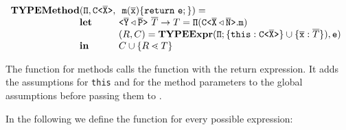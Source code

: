 \documentclass[a4paper,USenglish,cleveref, autoref, thm-restate]{lipics-v2021}
\begin{document}
\begin{gather*}
\begin{array}{@{}l@{}l@{}l}
  \typeMethod & (\ensuremath{\mv{\Pi} }, \exptype{C}{\ol{X}},\ &\  \mathtt{m}(\ol{x})\{ \mathtt{ return }\ \texttt{e}; \}) =\\
              & \textbf{let} & \exptype{}{\ol{Y} \triangleleft \ol{P}}\ \overline{T} \to T  = \mv{\Pi} (\exptype{C}{\ol{X} \triangleleft \ol{N}}.\mv{m})
  \\
              & %
                                                                                              & ({R}, \consSet) =
                                                                                                \typeExpr(\mv\Pi ; \set{\mv{this} :
                                                                                                \exptype{C}{\ol{X}} } \cup \set{ \ol{x} : \overline{{T}} }), \texttt{e})\\
              & \mathbf{in}
                                                                                              & \consSet \cup \set{{R} \lessdot {T}}\\
\end{array}
\end{gather*}

The \typeMethod{} function for methods calls the \typeExpr{} function with the
return expression. It adds the assumptions for \texttt{this} and for the method parameters to the global assumptions before passing them to \typeExpr.

\smallskip

In the following we define the \typeExpr{} function for every possible expression:

\smallskip
\end{document}
